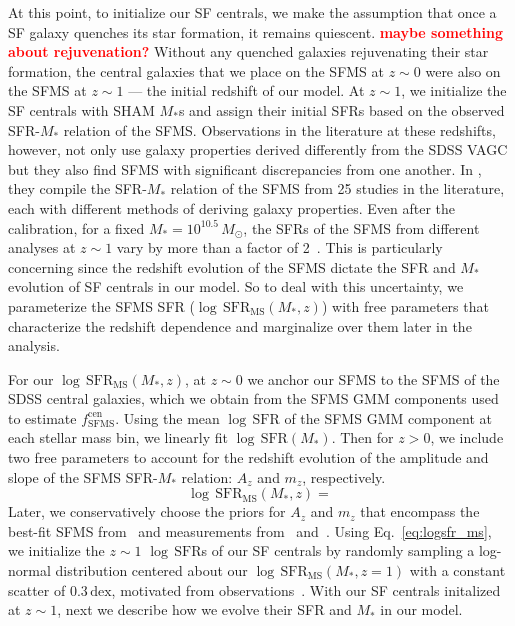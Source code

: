 \documentclass[12pt, letterpaper, preprint]{aastex}
\newcommand{\todo}[1]{{\bf \textcolor{red}{#1}}}
\newcommand{\beq}{\begin{equation}}
\newcommand{\eeq}{\end{equation}}
\begin{document}
At this point, to initialize our SF centrals,  we make the assumption 
that once a SF galaxy quenches its star formation, it remains quiescent. 
\todo{maybe something about rejuvenation?} 
Without any quenched galaxies rejuvenating their star formation, the central galaxies that 
we place on the SFMS at $z \sim 0$ were also on the SFMS at $z \sim 1$ --- 
the initial redshift of our model. At $z \sim 1$, we initialize the SF centrals
with SHAM $M_*$s and assign their initial SFRs based on the observed SFR-$M_*$ 
relation of the SFMS. Observations in the literature at these redshifts, 
however, not only use galaxy properties derived differently from the SDSS VAGC
but they also find SFMS with significant discrepancies from one another. 
In \cite{speagle2014}, they compile the SFR-$M_*$ relation of the SFMS 
from 25 studies in the literature, each with different methods of deriving 
galaxy properties. Even after the calibration, for a fixed $M_* = 10^{10.5}\, M_\odot$, 
the SFRs of the SFMS from different analyses at $z \sim 1$ vary by more than a factor of 
2~\citep[see Figure 2 of][]{speagle2014}. This is particularly concerning 
since the redshift evolution of the SFMS dictate the SFR and $M_*$ evolution 
of SF centrals in our model. So to deal with this uncertainty, we parameterize 
the SFMS SFR ($\log\,\mathrm{SFR}_\mathrm{MS}(M_*, z)$) with free parameters 
that characterize the redshift dependence and marginalize over them later in 
the analysis. 

For our $\log\,\mathrm{SFR}_\mathrm{MS}(M_*, z)$, at $z \sim 0$ we anchor our 
SFMS to the SFMS of the SDSS central galaxies, which we obtain from the 
SFMS GMM components used to estimate $f^\mathrm{cen}_\mathrm{SFMS}$. Using 
the mean $\log\, \mathrm{SFR}$ of the SFMS GMM component at each stellar 
mass bin, we linearly fit $\log\, \mathrm{SFR}(M_*)$. Then for $z > 0$, we 
include two free parameters to account for the redshift evolution of the 
amplitude and slope of the SFMS SFR-$M_*$ relation: $A_z$ and $m_z$, respectively. 
\beq \label{eq:logsfr_ms}
\log\,\mathrm{SFR}_\mathrm{MS}(M_*, z) = 
\eeq
Later, we conservatively choose the priors for $A_z$ and $m_z$ that encompass 
the best-fit SFMS from~\cite{speagle2014} and measurements from~\cite{moustakas2013} 
and~\cite{lee2015}. Using Eq.~\ref{eq:logsfr_ms}, we initialize the $z \sim 1$ 
$\log\, \mathrm{SFR}$s of our SF centrals by randomly sampling a log-normal distribution 
centered about our $\log\,\mathrm{SFR}_\mathrm{MS}(M_*, z=1)$ with a constant scatter 
of $0.3\,\mathrm{dex}$, motivated from observations~\citep{noeske2007, elbaz2007, daddi2007, salim2007, whitaker2012, lee2015}. 
With our SF centrals initalized at $z \sim 1$, next we describe how 
we evolve their SFR and $M_*$ in our model.
\end{document}
